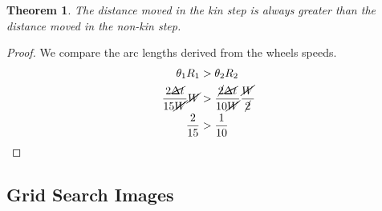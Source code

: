 \documentclass[conference]{IEEEtran}
\newtheorem{theorem}{Theorem}
\begin{document}
  \begin{theorem} \label{thm:seg}
    The distance moved in the kin step is always greater than the distance moved in the non-kin step.
  \end{theorem}
  \begin{proof}
    We compare the arc lengths derived from the wheels speeds.
    \begin{align*}
      \theta_1 R_1 &> \theta_2 R_2 \\
      \frac{2\cancel{\Delta t}}{15\cancel{W}} \cancel{W} &> \frac{\cancel{2}\cancel{\Delta t}}{10\cancel{W}} \frac{\cancel{W}}{\cancel{2}} \\
      \frac{2}{15} &> \frac{1}{10} \\
    \end{align*}
  \end{proof}

  \subsection{Grid Search Images} \label{section:grid_search_images}
\end{document}

